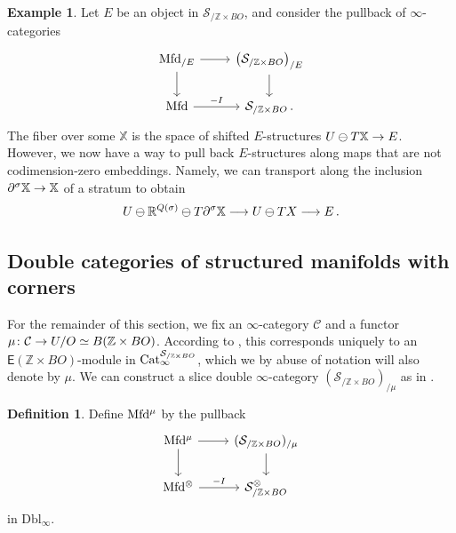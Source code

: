 \documentclass[10pt]{amsart}
\numberwithin{equation}{section}
\theoremstyle{definition}
\newtheorem{definition}[prop]{Definition}
\newtheorem{ex}[prop]{Example}
\newcommand{\Cat}{\mathrm{Cat}\vphantom{t}}
\newcommand{\Mfd}{\mathrm{Mfd}\vphantom{d}}
\newcommand{\bZ}{\mathbb{Z}}
\newcommand{\bR}{\mathbb{R}}
\newcommand{\bX}{\mathbb{X}}
\newcommand{\cC}{\mathcal{C}}
\newcommand{\cS}{\mathcal{S}}
\newcommand{\sfE}{\mathsf{E}}
\newcommand{\Dbl}{\mathrm{Dbl}}
\newcommand{\del}{\partial}
\renewcommand{\to}{\mathchoice{\longrightarrow}{\rightarrow}{}{}}
\begin{document}
\begin{ex}\label{ex:Mfd_/E}
	Let $E$ be an object in $\cS_{/\bZ\times BO}$, and consider the pullback of $\infty$-categories
	\begin{equation*}
		\begin{tikzcd}
			\Mfd_{/E} \arrow[r] \arrow[d]      &   \left(\cS_{/\bZ\times BO} \right)_{/E}  \arrow[d] \\
			\Mfd   \arrow[r, "-I"]               &   \cS_{/\bZ\times BO} \,.
		\end{tikzcd}
	\end{equation*}
	The fiber over some $\bX$ is the space of shifted $E$-structures $U\ominus T\bX \to E$.
  However, we now have a way to pull back $E$-structures along maps that are not codimension-zero embeddings.
	Namely, we can transport along the inclusion $\del^{\sigma}\bX\to \bX$ of a stratum to obtain
	\begin{align*}
		U \ominus \bR^{Q(\sigma)} \ominus T\del^{\sigma} \bX  \to U\ominus TX \to E \,.
	\end{align*}
\end{ex}

\subsection{Double categories of structured manifolds with corners}\label{subsec:double_categories_of_structured_manifolds}

For the remainder of this section, we fix an $\infty$-category $\cC$ and a functor $\mu \colon \cC\to U/O \simeq B(\bZ \times BO)$.
According to , this corresponds uniquely to an $\sfE(\bZ\times BO)$-module in $\Cat_{\infty}^{\cS_{/\bZ\times BO}}$, which we by abuse of notation will also denote by $\mu$.
We can construct a slice double $\infty$-category $(\cS_{/\bZ\times BO})_{/\mu}$ as in .

\begin{definition} \label{def:Mfd_mu}
	Define $\Mfd^{\mu}$ by the pullback
	\begin{equation*}
		\begin{tikzcd}
			\Mfd^{\mu} \arrow[r] \arrow[d] & (\cS_{/\bZ\times BO})_{/\mu} \arrow[d] \\
			\Mfd^{\otimes} \arrow[r,"-I"] & \cS^{\otimes}_{/\bZ \times BO}
		\end{tikzcd}
	\end{equation*}
	in $\Dbl_{\infty}$.
\end{definition}
\end{document}
